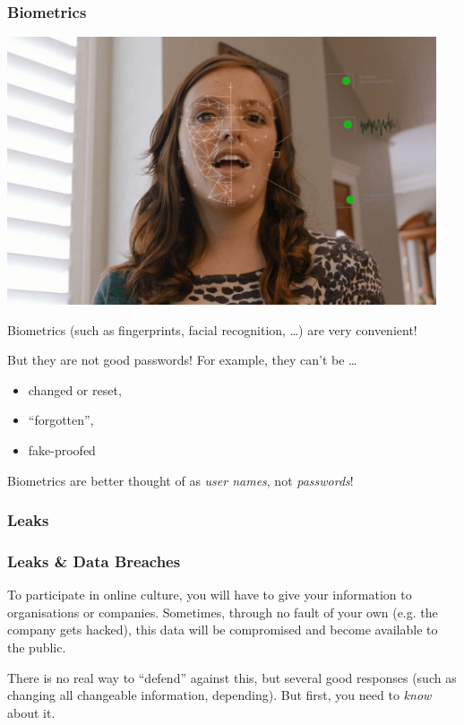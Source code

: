 \documentclass[aspectratio=169,dvipsnames]{beamer}
\begin{document}
\begin{frame}
\frametitle{Biometrics}

\begin{minipage}{0.5\textwidth}
\begin{center}
\includegraphics[width=0.95\textwidth, keepaspectratio]{images/hirevue.jpeg}
\end{center}
\end{minipage}\quad
\begin{minipage}{0.45\textwidth}
Biometrics (such as fingerprints, facial recognition, \dots) are very convenient!
\medskip

But they are not good passwords! For example, they can't be \dots

\begin{itemize}
\pause\item changed or reset,
\pause\item ``forgotten'',
\pause\item fake-proofed
\end{itemize}
\end{minipage}

\pause\bigskip
\begin{center}
\Large
Biometrics are better thought of as \emph{user names}, not \emph{passwords}!
\end{center}
\end{frame}

\subsubsection{Leaks}

\begin{frame}
\frametitle{Leaks \& Data Breaches}

To participate in online culture, you will have to give your information to organisations or companies. Sometimes, through no fault of your own (e.g. the company gets hacked), this data will be compromised and become available to the public.
\pause\bigskip

There is no real way to ``defend'' against this, but several good responses (such as changing all changeable information, depending). But first, you need to \emph{know} about it.
\end{frame}
\end{document}

